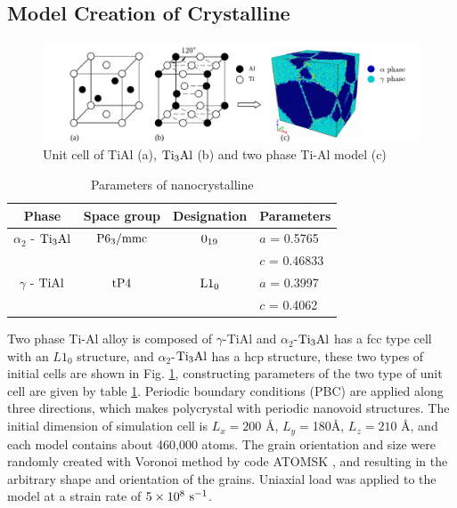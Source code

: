 \documentclass[Unknown,article,submit,moreauthors,pdftex,10pt,a4paper]{Definitions/mdpi}
\begin{document}
\subsection{Model Creation of Crystalline}
\begin{figure}[ht]
	\centering
	\includegraphics[width=1\linewidth]{img/modeling}
	\caption{Unit cell of \rm{TiAl} (a), $\rm{Ti_3Al}$ (b) and two phase Ti-Al model (c)}
	\label{fig:tial-cell}
\end{figure}

\begin{table}[ht]
	\caption{Parameters of nanocrystalline}
	\centering
	\begin{tabular}{c c c l}
	\toprule
	\textbf{Phase}			& {Space group}		& {Designation} 		& {Parameters} \\
	\midrule
	$\alpha_2$ - $\rm{Ti_3Al}$		& $\rm P6_3/mmc$ 	& $\rm 0_{19}$ 		& $a$ = 0.5765 \\
		&					&					& $c$ = 0.46833 \\
	$\gamma$ - $\rm{TiAl}$ 		& $\rm tP4$ 		& $\rm L1_0$		& $a$ = 0.3997 \\
		&					&					& $c$ = 0.4062 \\			
	\bottomrule
	\end{tabular} 
	\label{tab:lattice_parameter}
\end{table} 

Two phase Ti-Al alloy is composed of $\gamma $-TiAl and $\alpha_2$-$\rm Ti_3Al$ has a fcc type cell with an $L1_0$ structure, and $\alpha_2$-$\rm Ti_3Al$ has a hcp structure, these two types of initial cells are shown in Fig. \ref{fig:tial-cell}, constructing parameters of the two type of unit cell are given by table \ref{tab:lattice_parameter}. Periodic boundary conditions (PBC) are applied along three directions, which makes polycrystal with periodic nanovoid structures. The initial dimension of simulation cell is $L_x =200$ \si{\angstrom}, $L_y = $180\si{\angstrom}, $L_z = 210$ \si{\angstrom}, and each model contains about 460,000 atoms. The grain orientation and size were randomly created with Voronoi method by code ATOMSK \cite{Hirel2015}, and resulting in the arbitrary shape and orientation of the grains. Uniaxial load was applied to the model at a strain rate of $5\times10^8\ \rm{s}^{-1}$. 
\end{document}
